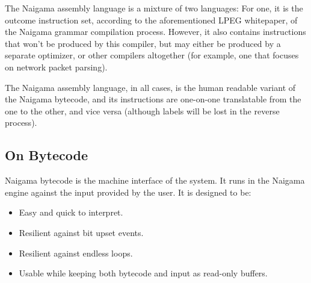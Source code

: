 The Naigama assembly language is a mixture of two languages:
For one, it is the outcome instruction set, according to the
aforementioned LPEG whitepaper,
of the Naigama grammar compilation process. However, it also contains
instructions that won't be produced by this compiler, but may
either be produced by a separate optimizer, or other compilers
altogether (for example, one that focuses on network packet
parsing).

The Naigama assembly language, in all cases, is the human readable
variant of the Naigama bytecode, and its instructions are one-on-one
translatable from the one to the other, and vice versa
(although labels will be lost in the reverse process).

\subsection{On Bytecode}

Naigama bytecode is the machine interface of the system.
It runs in the Naigama engine against the input provided by the user.
It is designed to be:

\begin{itemize}

\item Easy and quick to interpret.
\item Resilient against bit upset events.
\item Resilient against endless loops.
\item Usable while keeping both bytecode and input as read-only buffers.

\end{itemize}
